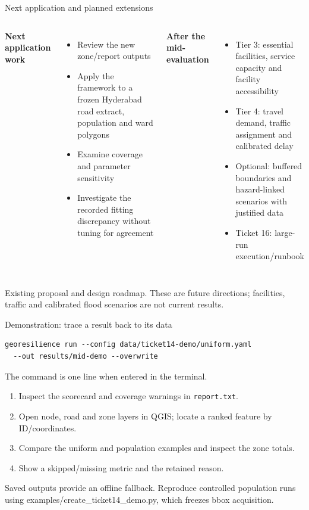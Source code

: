 \documentclass[11pt,aspectratio=169]{beamer}
\newcommand{\src}[1]{\vfill{\fontsize{7.5}{9}\selectfont\color{Muted}#1\par}}
\newcommand{\smallitems}{\setlength{\itemsep}{1.5mm}}
\begin{document}
\begin{frame}{Next application and planned extensions}
\begin{columns}[T,totalwidth=\textwidth]
\textbf{Next application work}
\begin{itemize}\smallitems
\item Review the new zone/report outputs
\item Apply the framework to a frozen Hyderabad road extract, population and ward polygons
\item Examine coverage and parameter sensitivity
\item Investigate the recorded fitting discrepancy without tuning for agreement
\end{itemize}
\textbf{After the mid-evaluation}
\begin{itemize}\smallitems
\item Tier 3: essential facilities, service capacity and facility accessibility
\item Tier 4: travel demand, traffic assignment and calibrated delay
\item Optional: buffered boundaries and hazard-linked scenarios with justified data
\item Ticket 16: large-run execution/runbook
\end{itemize}
\end{columns}
\src{Existing proposal and design roadmap. These are future directions; facilities, traffic and calibrated flood scenarios are not current results.}
\end{frame}

\begin{frame}[fragile]{Demonstration: trace a result back to its data}
\begin{lstlisting}
georesilience run --config data/ticket14-demo/uniform.yaml
  --out results/mid-demo --overwrite
\end{lstlisting}
\small The command is one line when entered in the terminal.
\begin{enumerate}\smallitems
\item Inspect the scorecard and coverage warnings in \texttt{report.txt}.
\item Open node, road and zone layers in QGIS; locate a ranked feature by ID/coordinates.
\item Compare the uniform and population examples and inspect the zone totals.
\item Show a skipped/missing metric and the retained reason.
\end{enumerate}
\src{Saved outputs provide an offline fallback. Reproduce controlled population runs using examples/create\_ticket14\_demo.py, which freezes bbox acquisition.}
\end{frame}
\end{document}
